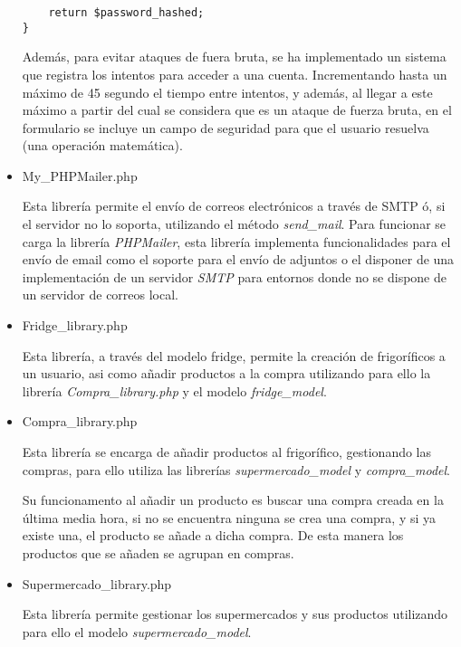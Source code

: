 \begin{itemize}
\begin{lstlisting}
    return $password_hashed;
}
            \end{lstlisting}

            Además, para evitar ataques de fuera bruta, se ha implementado un sistema que registra los intentos para acceder a una cuenta. Incrementando hasta un máximo de 45 segundo el tiempo entre intentos, y además, al llegar a este máximo a partir del cual se considera que es un ataque de fuerza bruta, en el formulario se incluye un campo de seguridad para que el usuario resuelva (una operación matemática).

        \item My\_PHPMailer.php

            Esta librería permite el envío de correos electrónicos a través de SMTP ó, si el servidor no lo soporta, utilizando el método \emph{send\_mail}. Para funcionar se carga la librería \emph{PHPMailer}, esta librería implementa funcionalidades para el envío de email como el soporte para el envío de adjuntos o el disponer de una implementación de un servidor \emph{SMTP} para entornos donde no se dispone de un servidor de correos local.

        \item Fridge\_library.php

            Esta librería, a través del modelo fridge, permite la creación de frigoríficos a un usuario, asi como añadir productos a la compra utilizando para ello la librería \emph{Compra\_library.php} y el modelo \emph{fridge\_model}.

        \item Compra\_library.php

            Esta librería se encarga de añadir productos al frigorífico, gestionando las compras, para ello utiliza las librerías \emph{supermercado\_model} y \emph{compra\_model}.

            Su funcionamento al añadir un producto es buscar una compra creada en la última media hora, si no se encuentra ninguna se crea una compra, y si ya existe una, el producto se añade a dicha compra. De esta manera los productos que se añaden se agrupan en compras.

        \item Supermercado\_library.php

            Esta librería permite gestionar los supermercados y sus productos utilizando para ello el modelo \emph{supermercado\_model}.
    \end{itemize}


